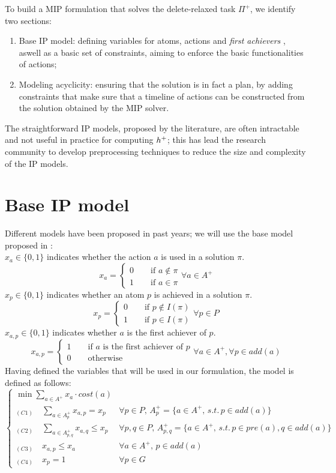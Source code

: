 To build a MIP formulation that solves the delete-relaxed task $\Pi^+$, we identify two sections:
\begin{enumerate}
    \item Base IP model: defining variables for atoms, actions and \textit{first achievers} \cite{Imai_15}, aswell as a basic set of constraints, aiming to enforce the basic functionalities of actions;
    \item Modeling acyclicity: ensuring that the solution is in fact a plan, by adding constraints that make sure that a timeline of actions can be constructed from the solution obtained by the MIP solver.
\end{enumerate}
The straightforward IP models, proposed by the literature, are often intractable and not useful in practice for computing $h^+$; this has lead the research community to develop preprocessing techniques to reduce the size and complexity of the IP models.

\section{Base IP model}
Different models have been proposed in past years; we will use the base model proposed in \cite{Rankooh_22}:\\
$x_a\in\{0,1\}$ indicates whether the action $a$ is used in a solution $\pi$.
$$x_a=
\begin{cases}
    0\qquad\mbox{if }a\not\in\pi\\
    1\qquad\mbox{if }a\in\pi
\end{cases}\forall a\in A^+
$$
$x_p\in\{0,1\}$ indicates whether an atom $p$ is achieved in a solution $\pi$.
$$x_p=
\begin{cases}
    0\qquad\mbox{if }p\not\in I(\pi)\\
    1\qquad\mbox{if }p\in I(\pi)
\end{cases}\forall p\in P
$$
$x_{a,p}\in\{0,1\}$ indicates whether $a$ is the first achiever of $p$.
$$x_{a,p}=
\begin{cases}
    1\qquad\mbox{if }a\mbox{ is the first achiever of }p\\
    0\qquad\mbox{otherwise}
\end{cases}\forall a\in A^+,\forall p\in add(a)
$$
Having defined the variables that will be used in our formulation, the model is defined as follows:
$$
\begin{cases}
    \displaystyle\min\sum_{ a\in A^+}x_a\cdot cost(a)\\
    \displaystyle_{(C1)}\quad\sum_{a\in A^+_p}x_{a,p}=x_p&\forall p\in P,\,A^+_p=\{a\in A^+,\,s.t.\,p\in add(a)\}\\
    \displaystyle_{(C2)}\quad\sum_{a\in A^+_{p,q}}x_{a,q}\leq x_p&\forall p,q\in P,\,A^+_{p,q}=\{a\in A^+,\,s.t.\,p\in pre(a),q\in add(a)\}\\
    _{(C3)}\quad x_{a,p}\leq x_a&\forall a\in A^+,\,p\in add(a)\\
    _{(C4)}\quad x_p=1&\forall p\in G
\end{cases}
$$

